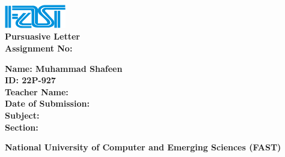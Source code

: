 \documentclass[12pt]{article}
\begin{document}
\begin{titlepage}
    \centering
    
    \vspace*{2cm}
    \includegraphics[width=0.2\textwidth]{1.png} \\[2cm] %
    
    {\Huge \textbf{Pursuasive Letter } {\hspace{10cm}}} \\[1cm]
    
    {\LARGE \textbf{Assignment No:} \underline{\hspace{5cm}}} \\[1.5cm]
    
    \begin{flushleft}
        \vspace{1cm}
        \LARGE \textbf{Name: Muhammad Shafeen} \underline{\hspace{10cm}} \\[0.7cm]
        \LARGE \textbf{ID: 22P-927} \underline{\hspace{10cm}} \\[0.7cm]
        \LARGE \textbf{Teacher Name:} \underline{\hspace{10cm}} \\[0.7cm]
        \LARGE \textbf{Date of Submission:} \underline{\hspace{8.5cm}} \\[0.7cm]
        \LARGE \textbf{Subject:} \underline{\hspace{10cm}} \\[0.7cm]
        \LARGE \textbf{Section:} \underline{\hspace{10cm}} \\[0.7cm]
    \end{flushleft}
    
    \vfill
    \Large \textbf{National University of Computer and Emerging Sciences (FAST)} \\[0.8cm]

    \vspace{1cm}

\end{titlepage}
\end{document}
